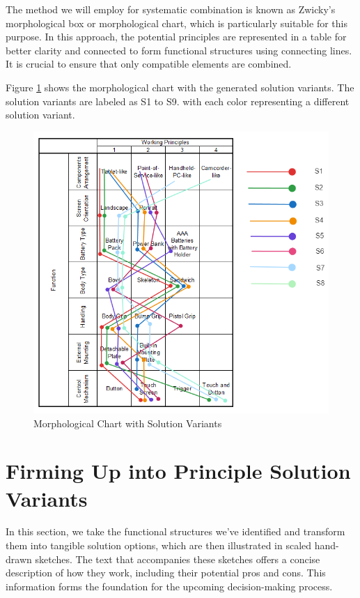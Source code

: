 The method we will employ for systematic combination is known as Zwicky's morphological box or morphological chart, which is particularly suitable for this purpose. In this approach, the potential principles are represented in a table for better clarity and connected to form functional structures using connecting lines. It is crucial to ensure that only compatible elements are combined.

Figure \ref{fig:morphological-chart-with-solution-variants} shows the morphological chart with the generated solution variants. The solution variants are labeled as S1 to S9. with each color representing a different solution variant.

\begin{figure}[ht!]
    \centering
    \includegraphics[width=\linewidth]{texs/Part1/chapter3/image/combinedchart.png}
    \caption{Morphological Chart with Solution Variants}
    \label{fig:morphological-chart-with-solution-variants}
\end{figure}

\section{Firming Up into Principle Solution Variants}
In this section, we take the functional structures we've identified and transform them into tangible solution options, which are then illustrated in scaled hand-drawn sketches. The text that accompanies these sketches offers a concise description of how they work, including their potential pros and cons. This information forms the foundation for the upcoming decision-making process.

